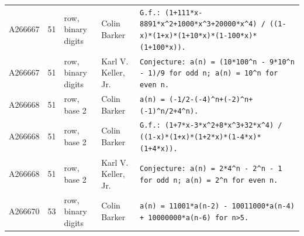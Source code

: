 \documentclass[11pt]{article}
\theoremstyle{definition}
\theoremstyle{remark}
\begin{document}
{\begin{longtable}{p{1.3cm}p{0.7cm}p{2.4cm}p{2.3cm}p{7.3cm}}
A266667 & 51 & row, binary digits & Colin Barker & \texttt{G.f.: \allowbreak{}(1+\allowbreak{}111*\allowbreak{}x-\allowbreak{}8891*\allowbreak{}x\^{}2+\allowbreak{}1000*\allowbreak{}x\^{}3+\allowbreak{}20000*\allowbreak{}x\^{}4)\allowbreak{} \allowbreak{}/\allowbreak{} \allowbreak{}((1-\allowbreak{}x)\allowbreak{}*\allowbreak{}(1+\allowbreak{}x)\allowbreak{}*\allowbreak{}(1+\allowbreak{}10*\allowbreak{}x)\allowbreak{}*\allowbreak{}(1-\allowbreak{}100*\allowbreak{}x)\allowbreak{}*\allowbreak{}(1+\allowbreak{}100*\allowbreak{}x)\allowbreak{})\allowbreak{}.} \\
A266667 & 51 & row, binary digits & Karl V. Keller, Jr. & \texttt{Conjecture: \allowbreak{}a(n)\allowbreak{} \allowbreak{}=\allowbreak{} \allowbreak{}(10*\allowbreak{}100\^{}n \allowbreak{}-\allowbreak{} \allowbreak{}9*\allowbreak{}10\^{}n \allowbreak{}-\allowbreak{} \allowbreak{}1)\allowbreak{}/\allowbreak{}9 \allowbreak{}for \allowbreak{}odd \allowbreak{}n; \allowbreak{}a(n)\allowbreak{} \allowbreak{}=\allowbreak{} \allowbreak{}10\^{}n \allowbreak{}for \allowbreak{}even \allowbreak{}n.} \\
A266668 & 51 & row, base 2 & Colin Barker & \texttt{a(n)\allowbreak{} \allowbreak{}=\allowbreak{} \allowbreak{}(-\allowbreak{}1/\allowbreak{}2-\allowbreak{}(-\allowbreak{}4)\allowbreak{}\^{}n+\allowbreak{}(-\allowbreak{}2)\allowbreak{}\^{}n+\allowbreak{}(-\allowbreak{}1)\allowbreak{}\^{}n/\allowbreak{}2+\allowbreak{}4\^{}n)\allowbreak{}.} \\
A266668 & 51 & row, base 2 & Colin Barker & \texttt{G.f.: \allowbreak{}(1+\allowbreak{}7*\allowbreak{}x-\allowbreak{}3*\allowbreak{}x\^{}2+\allowbreak{}8*\allowbreak{}x\^{}3+\allowbreak{}32*\allowbreak{}x\^{}4)\allowbreak{} \allowbreak{}/\allowbreak{} \allowbreak{}((1-\allowbreak{}x)\allowbreak{}*\allowbreak{}(1+\allowbreak{}x)\allowbreak{}*\allowbreak{}(1+\allowbreak{}2*\allowbreak{}x)\allowbreak{}*\allowbreak{}(1-\allowbreak{}4*\allowbreak{}x)\allowbreak{}*\allowbreak{}(1+\allowbreak{}4*\allowbreak{}x)\allowbreak{})\allowbreak{}.} \\
A266668 & 51 & row, base 2 & Karl V. Keller, Jr. & \texttt{Conjecture: \allowbreak{}a(n)\allowbreak{} \allowbreak{}=\allowbreak{} \allowbreak{}2*\allowbreak{}4\^{}n \allowbreak{}-\allowbreak{} \allowbreak{}2\^{}n \allowbreak{}-\allowbreak{} \allowbreak{}1 \allowbreak{}for \allowbreak{}odd \allowbreak{}n; \allowbreak{}a(n)\allowbreak{} \allowbreak{}=\allowbreak{} \allowbreak{}2\^{}n \allowbreak{}for \allowbreak{}even \allowbreak{}n.} \\
A266670 & 53 & row, binary digits & Colin Barker & \texttt{a(n)\allowbreak{} \allowbreak{}=\allowbreak{} \allowbreak{}11001*\allowbreak{}a(n-\allowbreak{}2)\allowbreak{} \allowbreak{}-\allowbreak{} \allowbreak{}10011000*\allowbreak{}a(n-\allowbreak{}4)\allowbreak{} \allowbreak{}+\allowbreak{} \allowbreak{}10000000*\allowbreak{}a(n-\allowbreak{}6)\allowbreak{} \allowbreak{}for \allowbreak{}n>5.} \\

\end{longtable}}
\end{document}
